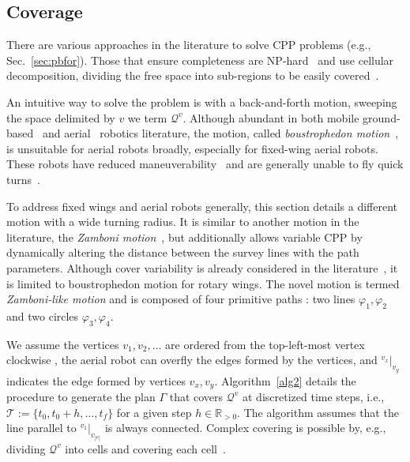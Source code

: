 \documentclass[letterpaper,10pt,conference,twoside]{IEEEtran}
\theoremstyle{definition}
\begin{document}
\vspace*{-1.4ex}
\subsection{Coverage}
\label{sec:cov-algo}

There are various approaches in the literature to solve CPP problems (e.g., Sec.~\ref{sec:pbfor}). Those that ensure %
completeness %
are NP-hard~\cite{arkin2000approximation} and use cellular decomposition, dividing the free space into sub-regions to be easily covered~\cite{choset2001coverage,galceran2013survey}.

An intuitive way to solve the problem is with a back-and-forth motion, sweeping the space delimited by $v$ we term $\mathcal{Q}^v$. Although abundant in both mobile ground-based~\cite{choset2001coverage%
} and aerial~\cite{araujo2013multiple,%
cabreira2018energy,difranco2015energy} robotics literature, the motion, called \emph{boustrophedon motion}~\cite{choset2001coverage}, is unsuitable for aerial robots broadly, especially for fixed-wing aerial robots. These robots have reduced maneuverability~\cite{dille2013efficient,mannadiar2010optimal,%
xu2014efficient} and are generally unable to fly quick turns~\cite{wang2017curvature}.

To address fixed wings and aerial robots generally, this section details a different motion with a wide turning radius. It is similar to another motion in the literature, the \emph{Zamboni motion}~\cite{araujo2013multiple}, but additionally allows variable CPP %
{\color{black} by dynamically altering the distance between the survey lines with the path parameters}. 
{\color{black} Although cover variability is already considered in the literature~\cite{difranco2015energy}, it is limited to boustrophedon motion for rotary wings.}
The novel motion is termed \emph{Zamboni-like motion} and is composed of four primitive paths%
: two lines $\varphi_1,\varphi_2$ and two circles $\varphi_3,\varphi_4$.%

We assume the vertices $v_1,v_2,\dots$ are ordered from the top-left-most vertex %
clockwise%
, the aerial robot can overfly the edges formed by the vertices, and ${}^{v_x}|_{v_y}$ indicates the edge formed by vertices $v_x,v_y$. 
Algorithm~\ref{alg2} details the procedure to generate the plan $\Gamma$ that covers $\mathcal{Q}^v$ %
{\color{black}at }discretized time step{\color{black}s}, i.e., $\mathcal{T}:=\{t_0,t_0+h,\dots,t_f\}$ for a given step $h\in\mathbb{R}_{>0}$. The algorithm assumes that the line parallel to ${}^{v_1}|_{v_{|v|}}$ is always connected. %
{\color{black}C}omplex covering is possible by, e.g., dividing $\mathcal{Q}^{v}$ into cells %
and %
covering each cell~\cite{choset2001coverage}.%
\end{document}
